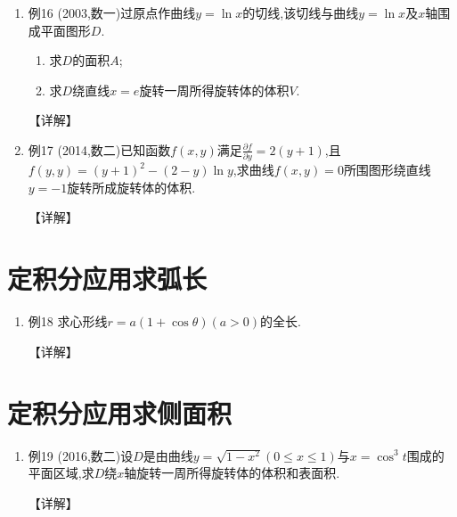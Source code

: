 \documentclass[12pt, a4paper, oneside, UTF8]{ctexbook}
\begin{document}
\begin{enumerate}[label=\arabic*.,start=15]
    \item 例16 (2003,数一)过原点作曲线$y=\ln x$的切线,该切线与曲线$y=\ln x$及$x$轴围成平面图形$D$.
    \begin{enumerate}[label=(\roman*)]
        \item 求$D$的面积$A$;
        \item 求$D$绕直线$x=e$旋转一周所得旋转体的体积$V$.
    \end{enumerate}
    
    \begin{solution}
    【详解】
    \end{solution}
    
    \item 例17 (2014,数二)已知函数$f(x, y)$满足$\frac{\partial f}{\partial y}=2(y+1)$,且$f(y, y)=(y+1)^2-(2-y)\ln y$,求曲线$f(x, y)=0$所围图形绕直线$y=-1$旋转所成旋转体的体积.
    
    \begin{solution}
    【详解】
    \end{solution}
\end{enumerate}

\section{ 定积分应用求弧长}

\begin{enumerate}[label=\arabic*.,start=17]
    \item 例18 求心形线$r=a(1+\cos\theta)(a>0)$的全长.
    
    \begin{solution}
    【详解】
    \end{solution}
\end{enumerate}

\section{ 定积分应用求侧面积}

\begin{enumerate}[label=\arabic*.,start=18]
    \item 例19 (2016,数二)设$D$是由曲线$y=\sqrt{1-x^2}(0\leq x\leq 1)$与$x=\cos^3 t$围成的平面区域,求$D$绕$x$轴旋转一周所得旋转体的体积和表面积.
    
    \begin{solution}
    【详解】
    \end{solution}
\end{enumerate}
\end{document}
